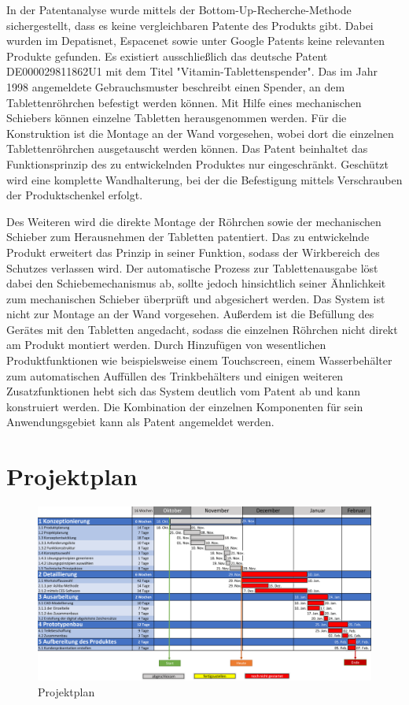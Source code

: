 In der Patentanalyse wurde mittels der Bottom-Up-Recherche-Methode sichergestellt, dass es keine vergleichbaren Patente des Produkts gibt. Dabei wurden im Depatisnet, Espacenet sowie unter Google Patents keine relevanten Produkte gefunden. Es existiert ausschließlich das deutsche Patent DE000029811862U1 \cite{patent} mit dem Titel "Vitamin-Tablettenspender". Das im Jahr 1998 angemeldete Gebrauchsmuster beschreibt einen Spender, an dem Tablettenröhrchen befestigt werden können. Mit Hilfe eines mechanischen Schiebers können einzelne Tabletten herausgenommen werden. Für die Konstruktion ist die Montage an der Wand vorgesehen, wobei dort die einzelnen Tablettenröhrchen ausgetauscht werden können. Das Patent beinhaltet das Funktionsprinzip des zu entwickelnden Produktes nur eingeschränkt. Geschützt wird eine komplette Wandhalterung, bei der die Befestigung mittels Verschrauben der Produktschenkel erfolgt.

Des Weiteren wird die direkte Montage der Röhrchen sowie der mechanischen Schieber zum Herausnehmen der Tabletten patentiert. Das zu entwickelnde Produkt erweitert das Prinzip in seiner Funktion, sodass der Wirkbereich des Schutzes verlassen wird. Der automatische Prozess zur Tablettenausgabe löst dabei den Schiebemechanismus ab, sollte jedoch hinsichtlich seiner Ähnlichkeit zum mechanischen Schieber überprüft und abgesichert werden. Das System ist nicht zur Montage an der Wand vorgesehen. Außerdem ist die Befüllung des Gerätes mit den Tabletten angedacht, sodass die einzelnen Röhrchen nicht direkt am Produkt montiert werden. Durch Hinzufügen von wesentlichen Produktfunktionen wie beispielsweise einem Touchscreen, einem Wasserbehälter zum automatischen Auffüllen des Trinkbehälters und einigen weiteren Zusatzfunktionen hebt sich das System deutlich vom Patent ab und kann konstruiert werden. Die Kombination der einzelnen Komponenten für sein Anwendungsgebiet kann als Patent angemeldet werden.

\section{Projektplan}
\begin{figure}[H]
	\centering
	\includegraphics[angle=90, height=0.9\textheight]{chapter/Bilder/ganttplan} 
	\caption{Projektplan}
\end{figure}

